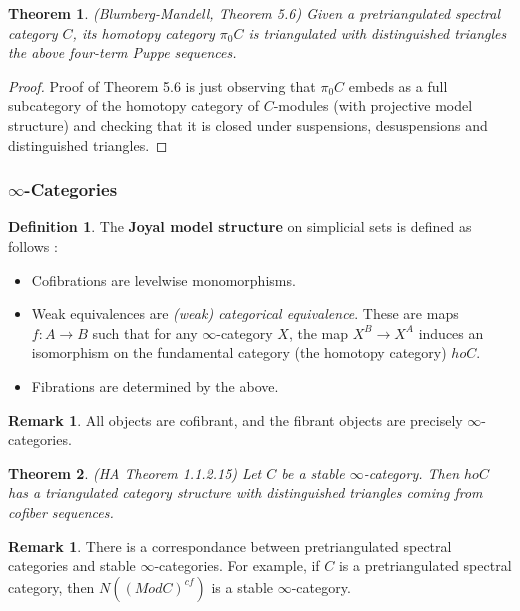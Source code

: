 \documentclass[letterpaper]{article}
\newtheorem{theorem}{Theorem}
\theoremstyle{definition}
\newtheorem{definition}[lemma]{Definition}
\newtheorem{remark}[lemma]{Remark}
\begin{document}
\begin{theorem}(Blumberg-Mandell, Theorem 5.6)
Given a pretriangulated spectral category $C$, its homotopy category $\pi_0 C$ is triangulated with distinguished triangles the above four-term Puppe sequences. 
\end{theorem}

\begin{proof}
Proof of Theorem 5.6 is just observing that $\pi_0 C$ embeds as a full subcategory of the homotopy category of $C$-modules (with projective model structure) and checking that it is closed under suspensions, desuspensions and distinguished triangles. 
\end{proof}

\subsubsection{$\infty$-Categories}

\begin{definition} The \textbf{Joyal model structure} on simplicial sets is defined as follows : 
\begin{itemize}
\item Cofibrations are levelwise monomorphisms.
\item Weak equivalences are \textit{(weak) categorical equivalence}. These are maps $f : A \rightarrow B$ such that for any $\infty$-category $X$, the map $X^B \rightarrow X^A$ induces an isomorphism on the fundamental category (the homotopy category) $ho C$. 
\item Fibrations are determined by the above. 
\end{itemize}
\end{definition}

\begin{remark}
All objects are cofibrant, and the fibrant objects are precisely $\infty$-categories. 
\end{remark}

\begin{theorem}(HA Theorem 1.1.2.15) Let $C$ be a stable $\infty$-category. Then $ho C$ has a triangulated category structure with distinguished triangles coming from cofiber sequences. 
\end{theorem}

\begin{remark}
There is a correspondance between pretriangulated spectral categories and stable $\infty$-categories. For example, if $C$ is a pretriangulated spectral category, then $N((ModC)^{cf})$ is a stable $\infty$-category. 
\end{remark}
\end{document}
